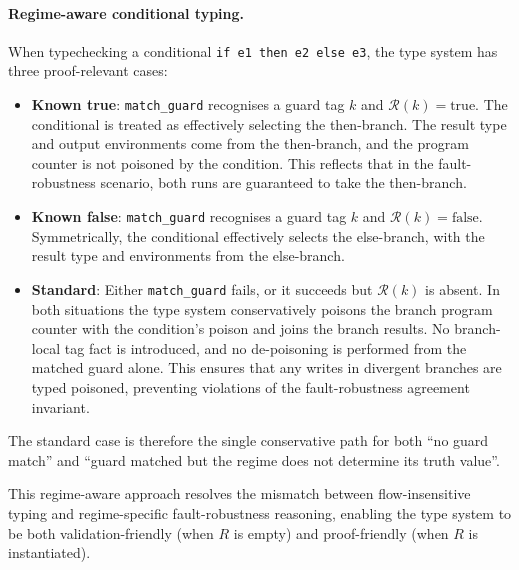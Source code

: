 \documentclass[12pt]{article}
\begin{document}
\paragraph{Regime-aware conditional typing.}
When typechecking a conditional \texttt{if e1 then e2 else e3}, the type system has three proof-relevant cases:
\begin{itemize}
  \item \textbf{Known true}: \texttt{match\_guard} recognises a guard tag $k$ and $\mathcal{R}(k) = \text{true}$. The conditional is treated as effectively selecting the then-branch. The result type and output environments come from the then-branch, and the program counter is not poisoned by the condition. This reflects that in the fault-robustness scenario, both runs are guaranteed to take the then-branch.
  \item \textbf{Known false}: \texttt{match\_guard} recognises a guard tag $k$ and $\mathcal{R}(k) = \text{false}$. Symmetrically, the conditional effectively selects the else-branch, with the result type and environments from the else-branch.
  \item \textbf{Standard}: Either \texttt{match\_guard} fails, or it succeeds but $\mathcal{R}(k)$ is absent. In both situations the type system conservatively poisons the branch program counter with the condition's poison and joins the branch results. No branch-local tag fact is introduced, and no de-poisoning is performed from the matched guard alone. This ensures that any writes in divergent branches are typed poisoned, preventing violations of the fault-robustness agreement invariant.
\end{itemize}

The standard case is therefore the single conservative path for both ``no
guard match'' and ``guard matched but the regime does not determine its truth
value''.

This regime-aware approach resolves the mismatch between flow-insensitive typing
and regime-specific fault-robustness reasoning, enabling the type system to be
both validation-friendly (when $R$ is empty) and proof-friendly (when $R$ is
instantiated).
\end{document}
